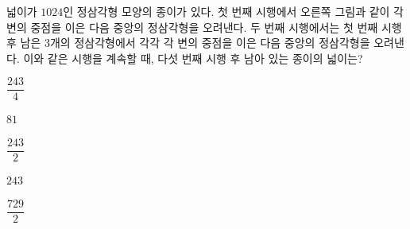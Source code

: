 \noindent\begin{minipage}[t]{0.58\linewidth}\vspace{0pt}\raggedright 넓이가 $1024$인 정삼각형 모양의 종이가 있다. 첫 번째 시행에서 오른쪽 그림과 같이 각 변의 중점을 이은 다음 중앙의 정삼각형을 오려낸다. 두 번째 시행에서는 첫 번째 시행 후 남은 3개의 정삼각형에서 각각 각 변의 중점을 이은 다음 중앙의 정삼각형을 오려낸다. 이와 같은 시행을 계속할 때, 다섯 번째 시행 후 남아 있는 종이의 넓이는?\end{minipage}\hfill\begin{minipage}[t]{0.4\linewidth}\vspace{0pt}\centering \resizebox{\ifdim\width>\linewidth\linewidth\else\width\fi}{!}{}\end{minipage}\par
\begin{choicesii}{\rule[-3ex]{0pt}{8ex}$\dfrac{243}{4}$}{\rule[-3ex]{0pt}{8ex}$81$}{\rule[-3ex]{0pt}{8ex}$\dfrac{243}{2}$}{\rule[-3ex]{0pt}{8ex}$243$}{\rule[-3ex]{0pt}{8ex}$\dfrac{729}{2}$}\end{choicesii}
